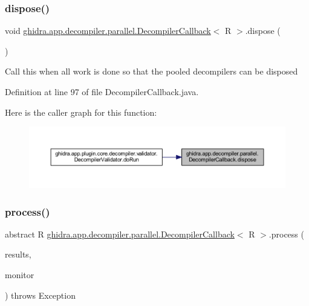 \subsubsection{\texorpdfstring{dispose()}{dispose()}}
{\footnotesize\ttfamily void \mbox{\hyperlink{classghidra_1_1app_1_1decompiler_1_1parallel_1_1_decompiler_callback}{ghidra.\+app.\+decompiler.\+parallel.\+Decompiler\+Callback}}$<$ R $>$.dispose (\begin{DoxyParamCaption}{ }\end{DoxyParamCaption})\hspace{0.3cm}{\ttfamily [inline]}}

Call this when all work is done so that the pooled decompilers can be disposed 

Definition at line 97 of file Decompiler\+Callback.\+java.

Here is the caller graph for this function\+:
\nopagebreak
\begin{figure}[H]
\begin{center}
\leavevmode
\includegraphics[width=350pt]{classghidra_1_1app_1_1decompiler_1_1parallel_1_1_decompiler_callback_a652c2f3d7b74015ec26bedb980920049_icgraph}
\end{center}
\end{figure}
\mbox{\label{classghidra_1_1app_1_1decompiler_1_1parallel_1_1_decompiler_callback_a88619cf2cd572fb627bf4ff62430ec2f}} 
\subsubsection{\texorpdfstring{process()}{process()}\hspace{0.1cm}{\footnotesize\ttfamily [1/2]}}
{\footnotesize\ttfamily abstract R \mbox{\hyperlink{classghidra_1_1app_1_1decompiler_1_1parallel_1_1_decompiler_callback}{ghidra.\+app.\+decompiler.\+parallel.\+Decompiler\+Callback}}$<$ R $>$.process (\begin{DoxyParamCaption}\item[{\mbox{\hyperlink{classghidra_1_1app_1_1decompiler_1_1_decompile_results}{Decompile\+Results}}}]{results,  }\item[{Task\+Monitor}]{monitor }\end{DoxyParamCaption}) throws Exception\hspace{0.3cm}{\ttfamily [abstract]}}

